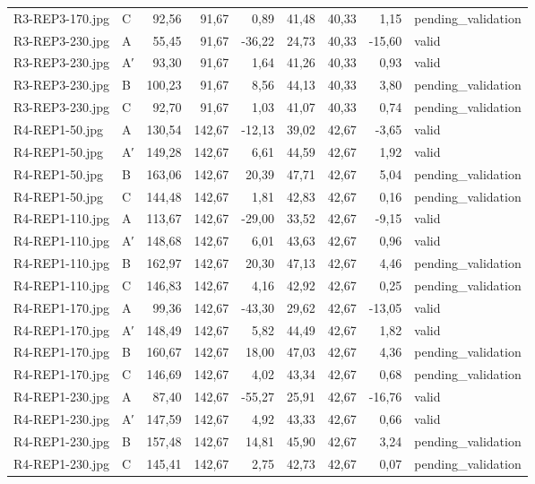 \begin{scriptsize}
\begin{longtable}{@{}llrrrrrrl@{}}
R3-REP3-170.jpg & C & 92,56 & 91,67 & 0,89 & 41,48 & 40,33 & 1,15 & pending\_validation \\
R3-REP3-230.jpg & A & 55,45 & 91,67 & -36,22 & 24,73 & 40,33 & -15,60 & valid \\
R3-REP3-230.jpg & A′ & 93,30 & 91,67 & 1,64 & 41,26 & 40,33 & 0,93 & valid \\
R3-REP3-230.jpg & B & 100,23 & 91,67 & 8,56 & 44,13 & 40,33 & 3,80 & pending\_validation \\
R3-REP3-230.jpg & C & 92,70 & 91,67 & 1,03 & 41,07 & 40,33 & 0,74 & pending\_validation \\
R4-REP1-50.jpg & A & 130,54 & 142,67 & -12,13 & 39,02 & 42,67 & -3,65 & valid \\
R4-REP1-50.jpg & A′ & 149,28 & 142,67 & 6,61 & 44,59 & 42,67 & 1,92 & valid \\
R4-REP1-50.jpg & B & 163,06 & 142,67 & 20,39 & 47,71 & 42,67 & 5,04 & pending\_validation \\
R4-REP1-50.jpg & C & 144,48 & 142,67 & 1,81 & 42,83 & 42,67 & 0,16 & pending\_validation \\
R4-REP1-110.jpg & A & 113,67 & 142,67 & -29,00 & 33,52 & 42,67 & -9,15 & valid \\
R4-REP1-110.jpg & A′ & 148,68 & 142,67 & 6,01 & 43,63 & 42,67 & 0,96 & valid \\
R4-REP1-110.jpg & B & 162,97 & 142,67 & 20,30 & 47,13 & 42,67 & 4,46 & pending\_validation \\
R4-REP1-110.jpg & C & 146,83 & 142,67 & 4,16 & 42,92 & 42,67 & 0,25 & pending\_validation \\
R4-REP1-170.jpg & A & 99,36 & 142,67 & -43,30 & 29,62 & 42,67 & -13,05 & valid \\
R4-REP1-170.jpg & A′ & 148,49 & 142,67 & 5,82 & 44,49 & 42,67 & 1,82 & valid \\
R4-REP1-170.jpg & B & 160,67 & 142,67 & 18,00 & 47,03 & 42,67 & 4,36 & pending\_validation \\
R4-REP1-170.jpg & C & 146,69 & 142,67 & 4,02 & 43,34 & 42,67 & 0,68 & pending\_validation \\
R4-REP1-230.jpg & A & 87,40 & 142,67 & -55,27 & 25,91 & 42,67 & -16,76 & valid \\
R4-REP1-230.jpg & A′ & 147,59 & 142,67 & 4,92 & 43,33 & 42,67 & 0,66 & valid \\
R4-REP1-230.jpg & B & 157,48 & 142,67 & 14,81 & 45,90 & 42,67 & 3,24 & pending\_validation \\
R4-REP1-230.jpg & C & 145,41 & 142,67 & 2,75 & 42,73 & 42,67 & 0,07 & pending\_validation \\

\end{longtable}
\end{scriptsize}

